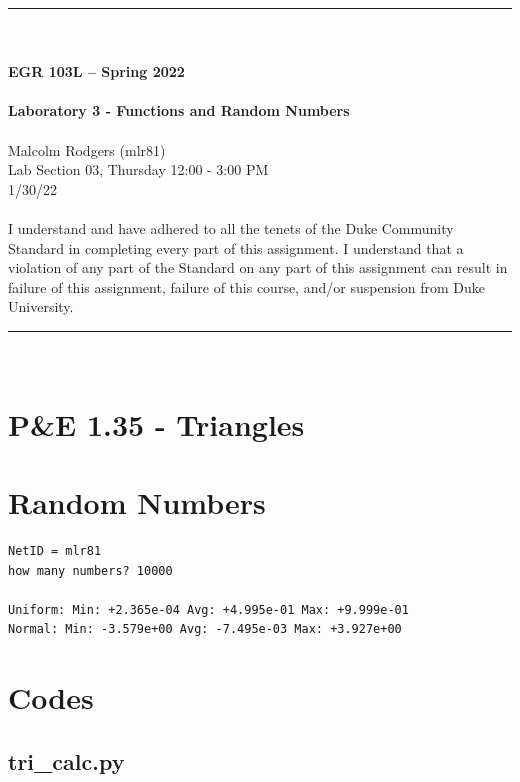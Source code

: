 \documentclass{article}
\begin{document}
\begin{center}
\rule{6.5in}{0.5mm}\\~\\
\textbf{\large EGR 103L -- Spring 2022}\\~\\
\textbf{\huge Laboratory 3 - Functions and Random Numbers}\\~\\
Malcolm Rodgers (mlr81)\\
Lab Section 03, Thursday 12:00 - 3:00 PM \\
1/30/22\\~\\
{\small I understand and have adhered to all the tenets of the Duke Community Standard in completing every part of this assignment.  I understand that a violation of any part of the Standard on any part of this assignment can result in failure of this assignment, failure of this course, and/or suspension from Duke University.} 
\rule{6.5in}{0.5mm}\\
\end{center}
\tableofcontents
\listoffigures
\pagebreak
\section{P&E 1.35 - Triangles}


\section{Random Numbers}
\begin{lstlisting}
NetID = mlr81
how many numbers? 10000

Uniform: Min: +2.365e-04 Avg: +4.995e-01 Max: +9.999e-01
Normal: Min: -3.579e+00 Avg: -7.495e-03 Max: +3.927e+00
\end{lstlisting}

\pagebreak
\appendix
\section{Codes}
\lstset{style=python103, language=python} 


\subsection{tri\_calc.py}

\clearpage
\end{document}
